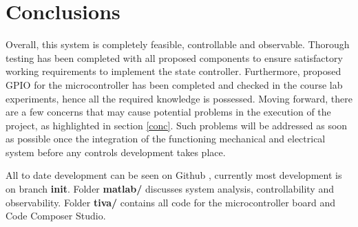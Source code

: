 \documentclass[12pt]{article}
\begin{document}
\section{Conclusions}
Overall, this system is completely feasible, controllable and observable. Thorough testing has been completed with all proposed components to ensure satisfactory working requirements to implement the state controller. Furthermore, proposed GPIO for the microcontroller has been completed and checked in the course lab experiments, hence all the required knowledge is possessed. Moving forward, there are a few concerns that may cause potential problems in the execution of the project, as highlighted in section \ref{conc}. Such problems will be addressed as soon as possible once the integration of the functioning mechanical and electrical system before any controls development takes place.\newline

All to date development can be seen on Github \cite{github}, currently most development is on branch \textbf{init}. Folder \textbf{matlab/} discusses system analysis, controllability and observability. Folder \textbf{tiva/} contains all code for the microcontroller board and Code Composer Studio.

\nocite{*}


\end{document}
